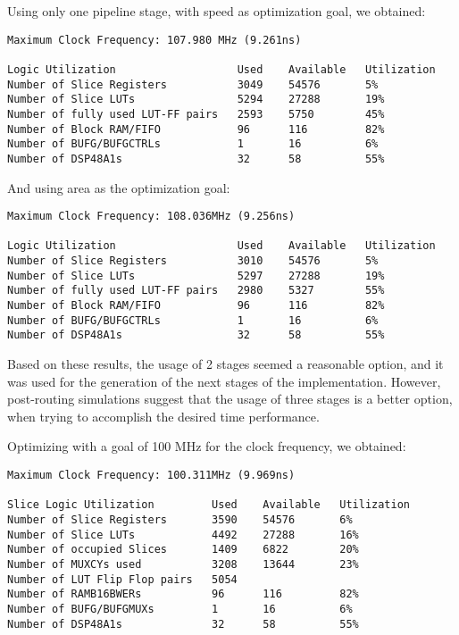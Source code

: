 \documentclass[12pt]{article}
\begin{document}
Using only one pipeline stage, with speed as optimization goal, we obtained:

\begin{verbatim}
Maximum Clock Frequency: 107.980 MHz (9.261ns)

Logic Utilization                   Used    Available   Utilization
Number of Slice Registers           3049    54576       5%
Number of Slice LUTs                5294    27288       19%
Number of fully used LUT-FF pairs   2593    5750        45%
Number of Block RAM/FIFO            96      116         82%
Number of BUFG/BUFGCTRLs            1       16          6%
Number of DSP48A1s                  32      58          55%
\end{verbatim}

And using area as the optimization goal:

\begin{verbatim}
Maximum Clock Frequency: 108.036MHz (9.256ns)

Logic Utilization                   Used    Available   Utilization
Number of Slice Registers           3010    54576       5%
Number of Slice LUTs                5297    27288       19%
Number of fully used LUT-FF pairs   2980    5327        55%
Number of Block RAM/FIFO            96      116         82%
Number of BUFG/BUFGCTRLs            1       16          6%
Number of DSP48A1s                  32      58          55%
\end{verbatim}

Based on these results, the usage of 2 stages seemed a reasonable option, and it was used for the
generation of the next stages of the implementation. However, post-routing simulations suggest that
the usage of three stages is a better option, when trying to accomplish the desired time
performance.

Optimizing with a goal of 100 MHz for the clock frequency, we obtained:

\begin{verbatim}
Maximum Clock Frequency: 100.311MHz (9.969ns)

Slice Logic Utilization         Used    Available   Utilization
Number of Slice Registers       3590    54576       6% 
Number of Slice LUTs            4492    27288       16%  
Number of occupied Slices       1409    6822        20%
Number of MUXCYs used           3208    13644       23% 
Number of LUT Flip Flop pairs   5054
Number of RAMB16BWERs           96      116         82%
Number of BUFG/BUFGMUXs         1       16          6%
Number of DSP48A1s              32      58          55%
\end{verbatim}
\end{document}
